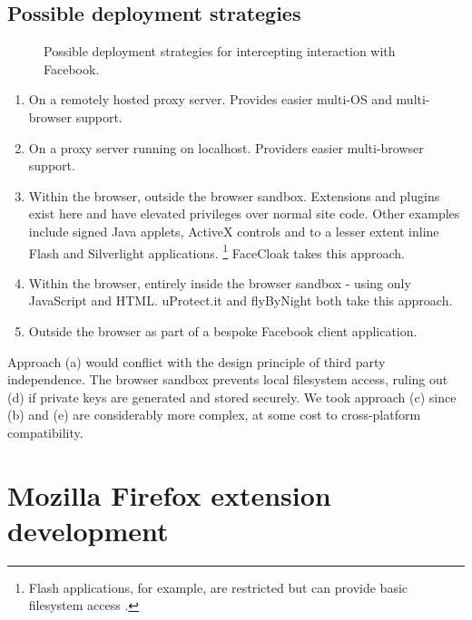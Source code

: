 \subsection{Possible deployment strategies}

\begin{figure}[tb]
\begin{center}
    
\caption{Possible deployment strategies for intercepting interaction with Facebook.}
\label{fig:approaches}
\end{center}
\end{figure}


\begin{enumerate}
\renewcommand{\labelenumi}{\alph{enumi})}
    
    \item On a remotely hosted proxy server. Provides easier multi-OS and multi-browser support.
    
    \item On a proxy server running on localhost. Providers easier multi-browser support.
    
    \item Within the browser, outside the browser sandbox. Extensions and plugins exist here and have elevated privileges over normal site code. Other examples include signed Java applets, ActiveX controls and to a lesser extent inline Flash and Silverlight applications. \footnote{Flash applications, for example, are restricted but can provide basic filesystem access \cite{flash-sbox}.} FaceCloak takes this approach.
    
    \item Within the browser, entirely inside the browser sandbox - using only JavaScript and HTML. uProtect.it and flyByNight both take this approach.
    
    \item Outside the browser as part of a bespoke Facebook client application.
    
\end{enumerate}
   
Approach (a) would conflict with the design principle of third party independence. The browser sandbox prevents local filesystem access, ruling out (d) if private keys are generated and stored securely. We took approach (c) since (b) and (e) are considerably more complex, at some cost to cross-platform compatibility.



\FloatBarrier
\section{Mozilla Firefox extension development}

